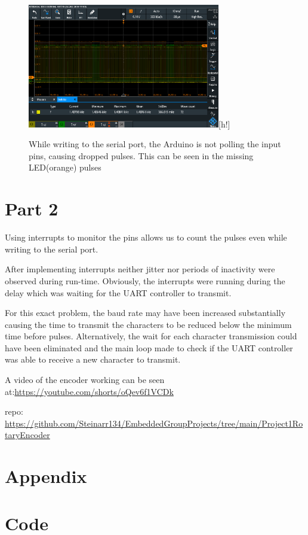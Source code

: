 \documentclass{article}
\begin{document}
\begin{figure}[h]
    \centering
    \includegraphics[width=0.75\textwidth]{Project1RotaryEncoder/oscilloscope_missing_pulses.PNG}[h!]
    \caption{While writing to the serial port, the Arduino is not polling the input pins, causing dropped pulses. This can be seen in the missing LED(orange) pulses}
    \label{fig:oscdrop}
\end{figure}


\section*{Part 2}
Using interrupts to monitor the pins allows us to count the pulses even while writing to the serial port.

After implementing interrupts neither jitter nor periods of inactivity were observed during run-time. Obviously, the interrupts were running during the delay which was waiting for the UART controller to transmit. 

For this exact problem, the baud rate may have been increased substantially causing the time to transmit the characters to be reduced below the minimum time before pulses. Alternatively, the wait for each character transmission could have been eliminated and the main loop made to check if the UART controller was able to receive a new character to transmit.


A video of the encoder working can be seen at:\newline  \url{https://youtube.com/shorts/oQev6f1VCDk}

repo: \newline\url{https://github.com/Steinarr134/EmbeddedGroupProjects/tree/main/Project1RotaryEncoder}
\newpage
\section*{Appendix}
\appendix
\section{Code}\label{appendix:code}






\end{document}
